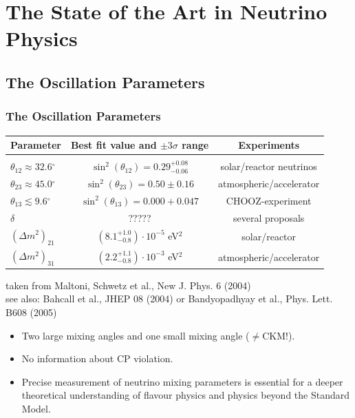 \documentclass{beamer}
\newcommand{\degrees}{\ensuremath{^\circ}}
\begin{document}
\section{The State of the Art in Neutrino Physics}

\subsection{The Oscillation Parameters}
\begin{frame}
	\frametitle{The Oscillation Parameters}

\begin{block}{}
    \begin{tabular}{lcc}
      Parameter         &  Best fit value and $\pm 3 \sigma$ range & Experiments \\ \hline \\ 
	$\theta_{12}\approx 32.6\degrees $		&  $\sin^2(\theta_{12})=0.29^{+0.08}_{-0.06}$	 & solar/reactor neutrinos \\ 
	$\theta_{23}\approx 45.0\degrees$ 		&  $\sin^2(\theta_{23})=0.50\pm 0.16$		&   atmospheric/accelerator\\
	$\theta_{13}\lesssim 9.6\degrees$ 		& $\sin^2(\theta_{13})=0.000+0.047$ & CHOOZ-experiment\\
	\hspace{0.8cm}$\delta$			 & ????? & several proposals\\
	\hspace{0.3cm}$(\Delta m^2)_{21}$  & $(8.1^{+1.0}_{-0.8})\cdot 10^{-5}$ eV$^2$ & solar/reactor\\
	\hspace{0.3cm}$(\Delta m^2)_{31}$  & $(2.2^{+1.1}_{-0.8}) \cdot 10^{-3}$ eV$^{2}$ & atmospheric/accelerator\\
	\end{tabular}
\begin{flushright}
\tiny{taken from Maltoni, Schwetz et al., New J. Phys. 6 (2004)\\
see also: Bahcall et al., JHEP 08 (2004) or Bandyopadhyay et al., Phys. Lett. B608 (2005)}
\end{flushright}
	 \end{block}

\begin{itemize}
    \item
    Two large mixing angles and one small mixing angle ($\neq$CKM!).

    \item
    No information about CP violation.

    \item
    Precise measurement of neutrino mixing parameters is essential for a deeper
    theoretical understanding of flavour physics and physics beyond the Standard Model.
  \end{itemize}


\end{frame}
\end{document}
